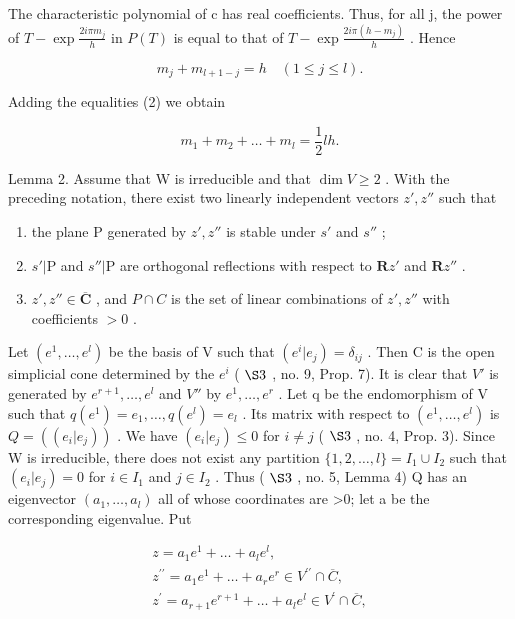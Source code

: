 The characteristic polynomial of c has real coefficients. Thus, for all j, the power of \(T - \exp\frac{2i\pi m_{j}}{h}\) in \(P(T)\) is equal to that of \(T - \exp\frac{2i\pi(h - m_{j})}{h}\) . Hence

\[
m _ {j} + m _ {l + 1 - j} = h \quad (1 \leqslant j \leqslant l).\tag{2}
\]

Adding the equalities (2) we obtain

\[
m _ {1} + m _ {2} + \dots + m _ {l} = \frac {1}{2} l h.\tag{3}
\]

Lemma 2. Assume that W is irreducible and that \(\dim V \geqslant 2\) . With the preceding notation, there exist two linearly independent vectors \(z', z''\) such that

\begin{enumerate}
\def\labelenumi{(\roman{enumi})}
\item
  the plane P generated by \(z', z''\) is stable under \(s'\) and \(s''\) ;
\item
  \(s'|\mathrm{P}\) and \(s''|\mathrm{P}\) are orthogonal reflections with respect to \(\mathbf{R}z'\) and \(\mathbf{R}z''\) .
\item
  \(z', z'' \in \overline{\mathbf{C}}\) , and \(P \cap C\) is the set of linear combinations of \(z', z''\) with coefficients \(> 0\) .
\end{enumerate}

Let \((e^{1},\ldots,e^{l})\) be the basis of V such that \((e^{i}|e_{j})=\delta_{ij}\) . Then C is the open simplicial cone determined by the \(e^{i}\) ( \(\S 3\) , no. 9, Prop. 7). It is clear that \(V'\) is generated by \(e^{r+1},\ldots,e^{l}\) and \(V''\) by \(e^{1},\ldots,e^{r}\) . Let q be the endomorphism of V such that \(q(e^{1})=e_{1},\ldots,q(e^{l})=e_{l}\) . Its matrix with respect to \((e^{1},\ldots,e^{l})\) is \(Q=((e_{i}|e_{j}))\) . We have \((e_{i}|e_{j})\leqslant0\) for \(i\neq j\) ( \(\S 3\) , no. 4, Prop. 3). Since W is irreducible, there does not exist any partition \(\{1,2,\ldots,l\}=I_{1}\cup I_{2}\) such that \((e_{i}|e_{j})=0\) for \(i\in I_{1}\) and \(j\in I_{2}\) . Thus ( \(\S 3\) , no. 5, Lemma 4) Q has an eigenvector \((a_{1},\ldots,a_{l})\) all of whose coordinates are \textgreater0; let a be the corresponding eigenvalue. Put

\[
\begin{array}{r} z = a _ {1} e ^ {1} + \dots + a _ {l} e ^ {l}, \\ z ^ {\prime \prime} = a _ {1} e ^ {1} + \dots + a _ {r} e ^ {r} \in V ^ {\prime \prime} \cap \overline {{C}}, \\ z ^ {\prime} = a _ {r + 1} e ^ {r + 1} + \dots + a _ {l} e ^ {l} \in V ^ {\prime} \cap \overline {{C}}, \end{array}
\]

